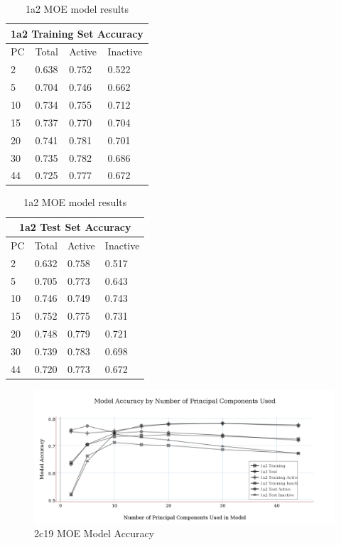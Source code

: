 \begin{table}[!h]
\begin{minipage}{.5\linewidth}
\centering
\begin{tabular}{|l|l|l|l|}
\hline
\multicolumn{4}{|c|}{1a2 Training Set Accuracy}   \\ \hline
PC & Total          & Active          & Inactive  \\ \hline
2  & 0.638          & 0.752           & 0.522     \\ \hline
5  & 0.704          & 0.746           & 0.662     \\ \hline
10 & 0.734          & 0.755           & 0.712     \\ \hline
15 & 0.737          & 0.770           & 0.704     \\ \hline
20 & 0.741          & 0.781           & 0.701     \\ \hline
30 & 0.735          & 0.782           & 0.686     \\ \hline
44 & 0.725          & 0.777           & 0.672     \\ \hline
\end{tabular}
\end{minipage}
\begin{minipage}{.5\linewidth}
\centering
\begin{tabular}{|l|l|l|l|}
\hline
\multicolumn{4}{|c|}{1a2 Test Set Accuracy}     \\ \hline
PC & Total          & Active          & Inactive \\ \hline
2  & 0.632          & 0.758           & 0.517   \\ \hline
5  & 0.705          & 0.773           & 0.643   \\ \hline
10 & 0.746          & 0.749           & 0.743   \\ \hline
15 & 0.752          & 0.775           & 0.731   \\ \hline
20 & 0.748          & 0.779           & 0.721   \\ \hline
30 & 0.739          & 0.783           & 0.698   \\ \hline
44 & 0.720          & 0.773           & 0.672   \\ \hline
\end{tabular}
\end{minipage}
\caption{1a2 MOE model results}
\end{table}

\begin{figure}[!h]
\includegraphics[width=1\textwidth]{../img/1a2_moe_model_accuracy.png}
\caption{2c19 MOE Model Accuracy}
\end{figure}

